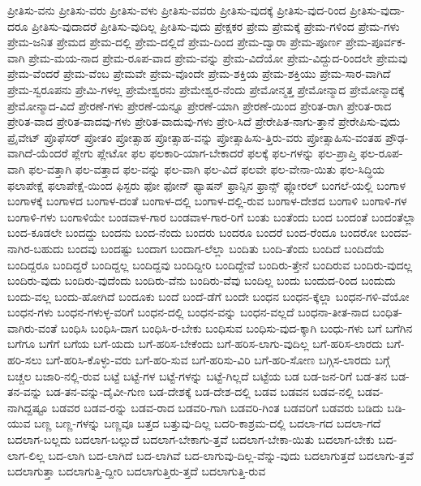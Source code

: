 {ಪ್ರೀತಿಸು-ವನು
ಪ್ರೀತಿಸು-ವರು
ಪ್ರೀತಿಸು-ವಳು
ಪ್ರೀತಿಸು-ವವರು
ಪ್ರೀತಿಸು-ವುದಕ್ಕೆ
ಪ್ರೀತಿಸು-ವುದ-ರಿಂದ
ಪ್ರೀತಿಸು-ವುದಾ-ದರೂ
ಪ್ರೀತಿಸು-ವುದಾದರೆ
ಪ್ರೀತಿಸು-ವುದಿಲ್ಲ
ಪ್ರೀತಿಸು-ವುದು
ಪ್ರೇಕ್ಷಕರ
ಪ್ರೇಮ
ಪ್ರೇಮಕ್ಕೆ
ಪ್ರೇಮ-ಗಳಿಂದ
ಪ್ರೇಮ-ಗಳು
ಪ್ರೇಮ-ಜನಿತ
ಪ್ರೇಮದ
ಪ್ರೇಮ-ದಲ್ಲಿ
ಪ್ರೇಮ-ದಲ್ಲಿದೆ
ಪ್ರೇಮ-ದಿಂದ
ಪ್ರೇಮ-ದ್ವಾರಾ
ಪ್ರೇಮ-ಪೂರ್ಣ
ಪ್ರೇಮ-ಪೂರ್ವಕ-ವಾಗಿ
ಪ್ರೇಮ-ಮಯ-ನಾದ
ಪ್ರೇಮ-ರೂಪ-ವಾದ
ಪ್ರೇಮ-ವನ್ನು
ಪ್ರೇಮ-ವಿದೆಯೋ
ಪ್ರೇಮ-ವಿದ್ದುದ-ರಿಂದಲೇ
ಪ್ರೇಮವು
ಪ್ರೇಮ-ವೆಂದರೆ
ಪ್ರೇಮ-ವೆಂಬ
ಪ್ರೇಮವೇ
ಪ್ರೇಮ-ವೊಂದೇ
ಪ್ರೇಮ-ಶಕ್ತಿಯ
ಪ್ರೇಮ-ಶಕ್ತಿಯು
ಪ್ರೇಮ-ಸಾರ-ವಾಗಿದೆ
ಪ್ರೇಮ-ಸ್ವರೂಪನು
ಪ್ರೇಮಿ-ಗಳಲ್ಲ
ಪ್ರೇಮೇಶ್ವರನು
ಪ್ರೇಮೇಶ್ವರ-ನೆಂದು
ಪ್ರೇಮೋನ್ಮತ್ತ
ಪ್ರೇಮೋನ್ಮಾದ
ಪ್ರೇಮೋನ್ಮಾದಕ್ಕೆ
ಪ್ರೇಮೋನ್ಮಾದ-ವಿದೆ
ಪ್ರೇರಣೆ-ಗಳು
ಪ್ರೇರಣೆ-ಯನ್ನೂ
ಪ್ರೇರಣೆ-ಯಾಗಿ
ಪ್ರೇರಣೆ-ಯಿಂದ
ಪ್ರೇರಿತ-ರಾಗಿ
ಪ್ರೇರಿತ-ರಾದ
ಪ್ರೇರಿತ-ವಾದ
ಪ್ರೇರಿತ-ವಾದವು-ಗಳು
ಪ್ರೇರಿತ-ವಾದುವು-ಗಳು
ಪ್ರೇರಿ-ಸಿದೆ
ಪ್ರೇರೇಪಿತ-ನಾಗು-ತ್ತಾನೆ
ಪ್ರೇರೇಪಿಸು-ವುದು
ಪ್ರೈವೇಟ್
ಪ್ರೊಫೆಸರ್
ಪ್ರೋತಂ
ಪ್ರೋತ್ಸಾಹ
ಪ್ರೋತ್ಸಾಹ-ವನ್ನು
ಪ್ರೋತ್ಸಾಹಿಸು-ತ್ತಿರು-ವರು
ಪ್ರೋತ್ಸಾಹಿಸು-ವಂತಹ
ಪ್ರೌಢ-ವಾಗಿದೆ-ಯೆಂದರೆ
ಪ್ಲೇಗು
ಪ್ಲೇಟೋ
ಫಲ
ಫಲಕಾರಿ-ಯಾಗ-ಬೇಕಾದರೆ
ಫಲಕ್ಕೆ
ಫಲ-ಗಳನ್ನು
ಫಲ-ಪ್ರಾಪ್ತಿ
ಫಲ-ರೂಪ-ವಾಗಿ
ಫಲ-ವತ್ತಾಗಿ
ಫಲ-ವತ್ತಾದ
ಫಲ-ವನ್ನು
ಫಲ-ವಾಗಿ
ಫಲ-ವಿದೆ
ಫಲವೇ
ಫಲ-ವೇನಾ-ಯಿತು
ಫಲ-ಸಿದ್ಧಿಯ
ಫಲಾಪೇಕ್ಷೆ
ಫಲಾಪೇಕ್ಷೆ-ಯಿಂದ
ಫಿಸ್ಟರು
ಫೋ
ಫೋನ್
ಫ್ಯಾಷನ್
ಫ್ರಾನ್ಸಿನ
ಫ್ರಾನ್ಸ್
ಫ್ಲೋರಲ್
ಬಂಗಲೆ-ಯಲ್ಲಿ
ಬಂಗಾಳ
ಬಂಗಾಳಕ್ಕೆ
ಬಂಗಾಳದ
ಬಂಗಾಳ-ದಂತೆ
ಬಂಗಾಳ-ದಲ್ಲಿ
ಬಂಗಾಳ-ದಲ್ಲಿ-ರುವ
ಬಂಗಾಳ-ದೇಶದ
ಬಂಗಾಳಿ
ಬಂಗಾಳಿ-ಗಳ
ಬಂಗಾಳಿ-ಗಳು
ಬಂಗಾಳಿಯೇ
ಬಂಡವಾಳ-ಗಾರ
ಬಂಡವಾಳ-ಗಾರ-ರಿಗೆ
ಬಂತು
ಬಂತೆಂದು
ಬಂದ
ಬಂದಂತೆ
ಬಂದಂತೆಲ್ಲಾ
ಬಂದ-ಕೂಡಲೇ
ಬಂದದ್ದು
ಬಂದನು
ಬಂದ-ನೆಂದು
ಬಂದರು
ಬಂದರೂ
ಬಂದರೆ
ಬಂದ-ರೆಂದೂ
ಬಂದರೋ
ಬಂದವ-ನಾಗಿರ-ಬಹುದು
ಬಂದವು
ಬಂದಷ್ಟು
ಬಂದಾಗ
ಬಂದಾಗ-ಲೆಲ್ಲಾ
ಬಂದಿತು
ಬಂದಿ-ತೆಂದು
ಬಂದಿದೆ
ಬಂದಿದೆಯೆ
ಬಂದಿದ್ದರೂ
ಬಂದಿದ್ದರೆ
ಬಂದಿದ್ದಲ್ಲ
ಬಂದಿದ್ದವು
ಬಂದಿದ್ದೀರಿ
ಬಂದಿದ್ದೇವೆ
ಬಂದಿರು-ತ್ತೇನೆ
ಬಂದಿರುವ
ಬಂದಿರು-ವುದಲ್ಲ
ಬಂದಿರು-ವುದು
ಬಂದಿರು-ವುದೆಂದು
ಬಂದಿರು-ವೆನು
ಬಂದಿರು-ವೆವು
ಬಂದಿಲ್ಲ
ಬಂದು
ಬಂದುದ-ರಿಂದ
ಬಂದುದು
ಬಂದು-ವಲ್ಲ
ಬಂದು-ಹೋಗಿದೆ
ಬಂದೂಕು
ಬಂದೆ
ಬಂದೆ-ಡೆಗೆ
ಬಂದೇ
ಬಂಧನ
ಬಂಧನ-ಕ್ಕೆಲ್ಲಾ
ಬಂಧನ-ಗಳಿ-ವೆಯೋ
ಬಂಧನ-ಗಳು
ಬಂಧನ-ಗಳುಳ್ಳ-ವರಿಗೆ
ಬಂಧನ-ದಲ್ಲಿ
ಬಂಧನ-ವನ್ನು
ಬಂಧನ-ವಲ್ಲದೆ
ಬಂಧನಾ-ತೀತ-ನಾದ
ಬಂಧಿತ-ವಾಗಿರು-ವಂತೆ
ಬಂಧಿಸಿ
ಬಂಧಿಸಿ-ದಾಗ
ಬಂಧಿಸಿ-ರ-ಬೇಕು
ಬಂಧಿಸುವ
ಬಂಧಿಸು-ವುದ-ಕ್ಕಾಗಿ
ಬಂಧು-ಗಳು
ಬಗೆ
ಬಗೆಗಿನ
ಬಗೆಗೂ
ಬಗೆಗೆ
ಬಗೆಯ
ಬಗೆ-ಯದು
ಬಗೆ-ಹರಿಸ-ಬೇಕೆಂದು
ಬಗೆ-ಹರಿಸ-ಲಾಗು-ವುದಿಲ್ಲ
ಬಗೆ-ಹರಿಸ-ಲಾರದು
ಬಗೆ-ಹರಿ-ಸಲು
ಬಗೆ-ಹರಿಸಿ-ಕೊಳ್ಳು-ವರು
ಬಗೆ-ಹರಿ-ಸುವ
ಬಗೆ-ಹರಿಸು-ವಿರಿ
ಬಗೆ-ಹರಿ-ಸೋಣ
ಬಗ್ಗಿಸ-ಲಾರದು
ಬಗ್ಗೆ
ಬಚ್ಚಲ
ಬಜಾರಿ-ನಲ್ಲಿ-ರುವ
ಬಟ್ಟೆ
ಬಟ್ಟೆ-ಗಳ
ಬಟ್ಟೆ-ಗಳನ್ನು
ಬಟ್ಟೆ-ಗಿಲ್ಲದೆ
ಬಟ್ಟೆಯ
ಬಡ
ಬಡ-ಜನ-ರಿಗೆ
ಬಡ-ತನ
ಬಡ-ತನ-ವನ್ನು
ಬಡ-ತನ-ವನ್ನು-ದೈವೀ-ಗುಣ
ಬಡ-ದೇಶಕ್ಕೆ
ಬಡ-ದೇಶ-ದಲ್ಲಿ
ಬಡವ
ಬಡವನ
ಬಡವ-ನಲ್ಲಿ
ಬಡವ-ನಾಗಿದ್ದಷ್ಟೂ
ಬಡವರ
ಬಡವ-ರನ್ನು
ಬಡವ-ರಾದ
ಬಡವರಿ-ಗಾಗಿ
ಬಡವರಿ-ಗಿಂತ
ಬಡವರಿಗೆ
ಬಡವರು
ಬಡಿದು
ಬಡಿ-ಯುವ
ಬಣ್ಣ
ಬಣ್ಣ-ಗಳನ್ನು
ಬಣ್ಣವೂ
ಬತ್ತದ
ಬತ್ತುವು-ದಿಲ್ಲ
ಬದರಿ-ಕಾಶ್ರಮ-ದಲ್ಲಿ
ಬದಲಾ-ಗದ
ಬದಲಾ-ಗದೆ
ಬದಲಾಗ-ಬಲ್ಲದು
ಬದಲಾಗ-ಬಲ್ಲುದೆ
ಬದಲಾಗ-ಬೇಕಾಗು-ತ್ತವೆ
ಬದಲಾಗ-ಬೇಕಾ-ಯಿತು
ಬದಲಾಗ-ಬೇಕು
ಬದ-ಲಾಗ-ಲಿಲ್ಲ
ಬದ-ಲಾಗಿ
ಬದ-ಲಾಗಿದೆ
ಬದ-ಲಾಗಿವೆ
ಬದ-ಲಾಗುವು-ದಿಲ್ಲ-ವೆನ್ನು-ವುದು
ಬದಲಾಗುತ್ತದೆ
ಬದಲಾಗು-ತ್ತವೆ
ಬದಲಾಗುತ್ತಾ
ಬದಲಾಗುತ್ತಿ-ದ್ದೀರಿ
ಬದಲಾಗುತ್ತಿರು-ತ್ತದೆ
ಬದಲಾಗುತ್ತಿ-ರುವ
}
